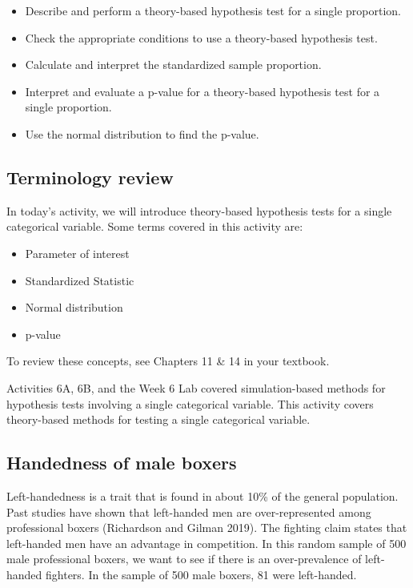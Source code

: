 \documentclass[
]{report}
\begin{document}
\begin{itemize}
\item
  Describe and perform a theory-based hypothesis test for a single proportion.
\item
  Check the appropriate conditions to use a theory-based hypothesis test.
\item
  Calculate and interpret the standardized sample proportion.
\item
  Interpret and evaluate a p-value for a theory-based hypothesis test for a single proportion.
\item
  Use the normal distribution to find the p-value.
\end{itemize}

\hypertarget{terminology-review-10}{%
\subsection{Terminology review}\label{terminology-review-10}}

In today's activity, we will introduce theory-based hypothesis tests for a single categorical variable. Some terms covered in this activity are:

\begin{itemize}
\item
  Parameter of interest
\item
  Standardized Statistic
\item
  Normal distribution
\item
  p-value
\end{itemize}

To review these concepts, see Chapters 11 \& 14 in your textbook.

Activities 6A, 6B, and the Week 6 Lab covered simulation-based methods for hypothesis tests involving a single categorical variable. This activity covers theory-based methods for testing a single categorical variable.

\hypertarget{handedness-of-male-boxers}{%
\subsection{Handedness of male boxers}\label{handedness-of-male-boxers}}

Left-handedness is a trait that is found in about 10\% of the general population. Past studies have shown that left-handed men are over-represented among professional boxers (Richardson and Gilman 2019). The fighting claim states that left-handed men have an advantage in competition. In this random sample of 500 male professional boxers, we want to see if there is an over-prevalence of left-handed fighters. In the sample of 500 male boxers, 81 were left-handed.
\end{document}
